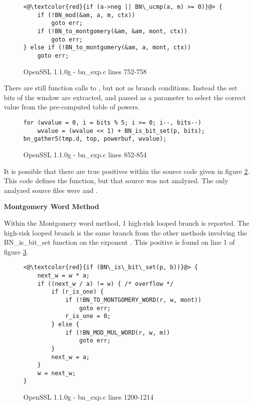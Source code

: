 \begin{figure}[h!]
\begin{lstlisting}
<@\textcolor{red}{if (a->neg || BN\_ucmp(a, m) >= 0)}@> {
    if (!BN_mod(&am, a, m, ctx))
        goto err;
    if (!BN_to_montgomery(&am, &am, mont, ctx))
        goto err;
} else if (!BN_to_montgomery(&am, a, mont, ctx))
    goto err;
\end{lstlisting}
\caption{OpenSSL 1.1.0g - bn\_exp.c lines 752-758}
\label{code:mont-const-compare}
\end{figure}

There are still function calls to , but not as branch
conditions. Instead the set bits of the window are extracted, and passed as a
parameter to select the correct value from the pre-computed table of powers.


\begin{figure}[h!]
\begin{lstlisting}
for (wvalue = 0, i = bits % 5; i >= 0; i--, bits--)
    wvalue = (wvalue << 1) + BN_is_bit_set(p, bits);
bn_gather5(tmp.d, top, powerbuf, wvalue);
\end{lstlisting}
\caption{OpenSSL 1.1.0g - bn\_exp.c lines 852-854}
\label{code:mont-const-scatter-gather}
\end{figure}

It is possible that there are true positives within the source code given in
figure \ref{code:mont-const-scatter-gather}. This code defines the
 function, but that source was not analyzed. The only
analyzed source files were  and .

\noindent
\textbf{Montgomery Word Method}


Within the Montgomery word method, 1 high-risk looped branch is reported. The
  high-risk looped branch is the same branch from the other methods involving the
  BN\_is\_bit\_set function on the exponent . This positive is found
  on line 1 of figure \ref{code:mont-word-is-bit-set}.

  \begin{figure}
    \begin{lstlisting}
<@\textcolor{red}{if (BN\_is\_bit\_set(p, b))}@> {
    next_w = w * a;
    if ((next_w / a) != w) { /* overflow */
        if (r_is_one) {
            if (!BN_TO_MONTGOMERY_WORD(r, w, mont))
                goto err;
            r_is_one = 0;
        } else {
            if (!BN_MOD_MUL_WORD(r, w, m))
                goto err;
        }
        next_w = a;
    }
    w = next_w;
}
    \end{lstlisting}
    \caption{OpenSSL 1.1.0g - bn\_exp.c lines 1200-1214}
    \label{code:mont-word-is-bit-set}
  \end{figure}


